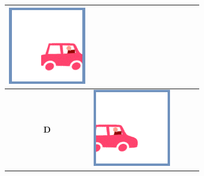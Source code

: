 \documentclass[12pt]{article}
\begin{document}
\begin{minipage}{\textwidth}
\begin{table}[H]
\begin{tabulary}{\linewidth}{|C|CCCC|}
				\vspace{0.01cm}\includegraphics[width=\linewidth]{option4}
				\\ \hline
				\textbf{D} &
				\vspace{0.01cm}\includegraphics[width=\linewidth]{option1} &

\end{tabulary}
\end{table}
\end{minipage}
\end{document}
